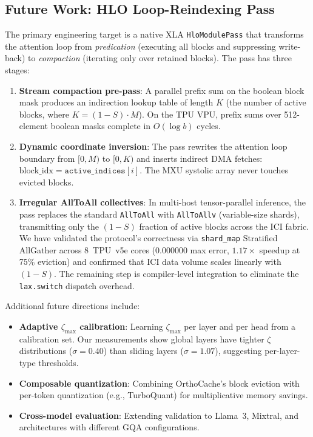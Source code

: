 \documentclass[conference,10pt]{IEEEtran}
\begin{document}
\subsection{Future Work: HLO Loop-Reindexing Pass}

The primary engineering target is a native XLA \texttt{HloModulePass} that
transforms the attention loop from \emph{predication} (executing all blocks
and suppressing write-back) to \emph{compaction} (iterating only over
retained blocks). The pass has three stages:

\begin{enumerate}
    \item \textbf{Stream compaction pre-pass}: A parallel prefix sum on the
          boolean block mask produces an indirection lookup table of length
          $K$ (the number of active blocks, where $K = (1-S) \cdot M$).
          On the TPU VPU, prefix sums over 512-element boolean masks
          complete in $O(\log b)$ cycles.
    \item \textbf{Dynamic coordinate inversion}: The pass rewrites the
          attention loop boundary from $[0, M)$ to $[0, K)$ and inserts
          indirect DMA fetches:
          $\text{block\_idx} = \texttt{active\_indices}[i]$. The MXU
          systolic array never touches evicted blocks.
    \item \textbf{Irregular AllToAll collectives}: In multi-host
          tensor-parallel inference, the pass replaces the standard
          \texttt{AllToAll} with \texttt{AllToAllv} (variable-size shards),
          transmitting only the $(1-S)$ fraction of active blocks across
          the ICI fabric. We have validated the protocol's correctness
          via \texttt{shard\_map} Stratified AllGather across 8~TPU~v5e
          cores ($0.000000$ max error, $1.17\times$ speedup at 75\%
          eviction) and confirmed that ICI data volume scales linearly
          with $(1-S)$. The remaining step is compiler-level integration
          to eliminate the \texttt{lax.switch} dispatch overhead.
\end{enumerate}

\noindent Additional future directions include:
\begin{itemize}
    \item \textbf{Adaptive $\zeta_{\max}$ calibration}: Learning
          $\zeta_{\max}$ per layer and per head from a calibration set.
          Our measurements show global layers have tighter $\zeta$
          distributions ($\sigma = 0.40$) than sliding layers
          ($\sigma = 1.07$), suggesting per-layer-type thresholds.
    \item \textbf{Composable quantization}: Combining OrthoCache's block
          eviction with per-token quantization (e.g., TurboQuant) for
          multiplicative memory savings.
    \item \textbf{Cross-model evaluation}: Extending validation to Llama~3,
          Mixtral, and architectures with different GQA configurations.
\end{itemize}
\end{document}
